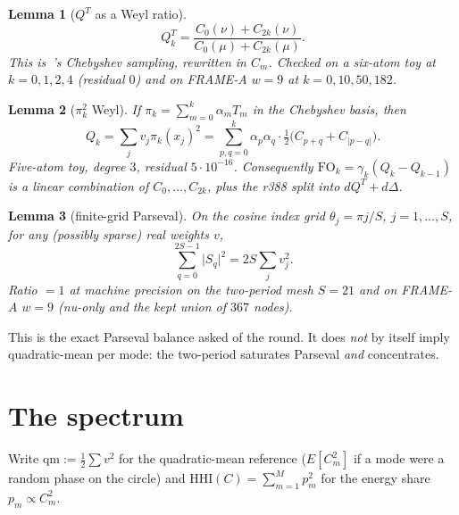 \documentclass[11pt]{article}
\newtheorem{lemma}{Lemma}
\theoremstyle{remark}
\begin{document}
\begin{lemma}[$Q^T$ as a Weyl ratio]\label{lem:QT}
\[
Q_k^T
=
\frac{C_0(\nu)+C_{2k}(\nu)}{C_0(\mu)+C_{2k}(\mu)}.
\]
This is~\cite{r385}'s Chebyshev sampling, rewritten in $C_m$.
Checked on a six-atom toy at $k=0,1,2,4$ (residual $0$) and on
FRAME-A $w=9$ at $k=0,10,50,182$.
\end{lemma}

\begin{lemma}[$\pi_k^2$ Weyl]\label{lem:pik}
If $\pi_k=\sum_{m=0}^k\alpha_m T_m$ in the Chebyshev basis, then
\[
Q_k
=
\sum_j v_j\pi_k(x_j)^2
=
\sum_{p,q=0}^k\alpha_p\alpha_q\cdot\tfrac12\bigl(C_{p+q}+C_{\lvert p-q\rvert}\bigr).
\]
Five-atom toy, degree $3$, residual $5\cdot10^{-16}$.
Consequently $\mathrm{FO}_k=\gamma_k(Q_k-Q_{k-1})$ is a linear
combination of $C_0,\ldots,C_{2k}$, plus the r388 split into
$dQ^T+d\Delta$.
\end{lemma}

\begin{lemma}[finite-grid Parseval]\label{lem:parseval}
On the cosine index grid $\theta_j=\pi j/S$, $j=1,\ldots,S$,
for any (possibly sparse) real weights $v$,
\[
\sum_{q=0}^{2S-1}\lvert S_q\rvert^2
=
2S\sum_j v_j^2.
\]
Ratio $=1$ at machine precision on the two-period mesh $S=21$
and on FRAME-A $w=9$ (nu-only and the kept union of $367$ nodes).
\end{lemma}

This is the exact Parseval balance asked of the round.
It does \emph{not} by itself imply quadratic-mean per mode:
the two-period saturates Parseval \emph{and} concentrates.

\section{The spectrum}\label{sec:spec}

Write $\mathrm{qm}:=\tfrac12\sum v^2$ for the quadratic-mean
reference ($E[C_m^2]$ if a mode were a random phase on the circle)
and $\mathrm{HHI}(C)=\sum_{m=1}^{M} p_m^2$ for the energy share
$p_m\propto C_m^2$.
\end{document}
